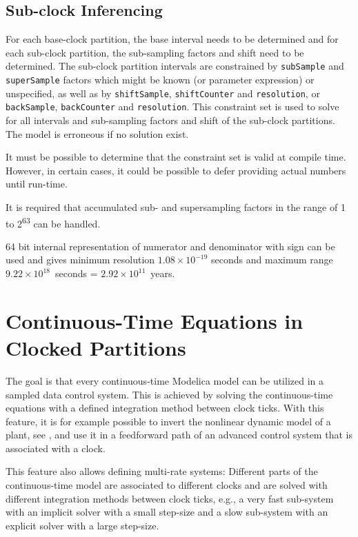 \subsection{Sub-clock Inferencing}\label{sub-clock-inferencing}

For each base-clock partition, the base interval needs to be determined and for each sub-clock partition, the sub-sampling factors and shift need to be determined.
The sub-clock partition intervals are constrained by \lstinline!subSample! and \lstinline!superSample! factors which might be known (or parameter expression) or unspecified, as well as by \lstinline!shiftSample!, \lstinline!shiftCounter! and \lstinline!resolution!, or \lstinline!backSample!, \lstinline!backCounter! and \lstinline!resolution!.
This constraint set is used to solve for all intervals and sub-sampling factors and shift of the sub-clock partitions.
The model is erroneous if no solution exist.

\begin{nonnormative}
It must be possible to determine that the constraint set is valid at compile time.  However, in certain cases, it could be possible to defer providing actual numbers until run-time.
\end{nonnormative}

It is required that accumulated sub- and supersampling factors in the range of 1 to 2\textsuperscript{63} can be handled.

\begin{nonnormative}
64 bit internal representation of numerator and denominator with sign can be used and gives minimum resolution $1.08\times 10^{-19}$ seconds and maximum range $9.22\times 10^{18}$~seconds = $2.92\times 10^{11}$~years.
\end{nonnormative}

\section{Continuous-Time Equations in Clocked Partitions}\label{continuous-time-equations-in-clocked-partitions}

\begin{nonnormative}
The goal is that every continuous-time Modelica model can be utilized in a sampled data control system.
This is achieved by solving the continuous-time equations with a defined integration method between clock ticks.
With this feature, it is for example possible to invert the nonlinear dynamic model of a plant, see \textcite{ThummelEtAl2005InverseModels}, and use it in a feedforward path of an advanced control system that is associated with a clock.

This feature also allows defining multi-rate systems: Different parts of the continuous-time model are associated to different clocks and are solved with different integration
methods between clock ticks, e.g., a very fast sub-system with an implicit solver with a small step-size and a slow sub-system with an explicit solver with a large step-size.
\end{nonnormative}


